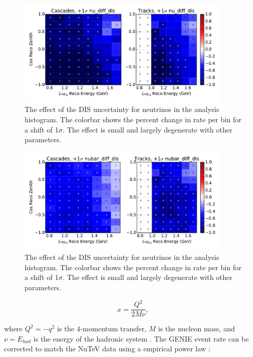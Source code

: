 \begin{figure}
\centering
\includegraphics[width=0.9\textwidth]{systematics/nu_diff_dis_variation.pdf} 
\caption[Effect of the neutrino DIS uncertainty in the analysis histogram]{The effect of the DIS uncertainty for neutrinos in the analysis histogram. The colorbar shows the percent change in rate per bin for a shift of 1$\sigma$. The effect is small and largely degenerate with other parameters.}
\label{fig:systematics_nu_dis}
\end{figure}

\begin{figure}
\centering
\includegraphics[width=0.9\textwidth]{systematics/nubar_diff_dis_variation.pdf} 
\caption[Effect of the neutrino DIS uncertainty in the analysis histogram]{The effect of the DIS uncertainty for neutrinos in the analysis histogram. The colorbar shows the percent change in rate per bin for a shift of 1$\sigma$. The effect is small and largely degenerate with other parameters.}
\label{fig:systematics_nubar_dis}
\end{figure}

\begin{equation}
x = \frac{Q^2}{2M\nu} , 
\end{equation}

where $Q^2=-q^2$ is the 4-momentum transfer, $M$ is the nucleon mass, and $\nu=E_{had}$ is the energy of the hadronic system \cite{Formaggio-Xsec}.
The GENIE event rate can be corrected to match the NuTeV data using a empirical power law \cite{DIS-Reweighting}:

